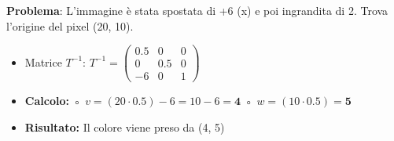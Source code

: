 \documentclass[
]{article}
\providecommand{\tightlist}{%
  \setlength{\itemsep}{0pt}\setlength{\parskip}{0pt}}
\begin{document}
\textbf{Problema}: L'immagine è stata spostata di +6 (x) e poi ingrandita di 2. Trova l'origine del pixel (20, 10).

\begin{itemize}
\tightlist
\item
  Matrice \(T^{-1}\):
  \(T^{-1} = \begin{pmatrix} 0.5 & 0 & 0 \\ 0 & 0.5 & 0 \\ -6 & 0 & 1 \end{pmatrix}\)
\item
  \textbf{Calcolo:}
  ◦ \(v = (20 \cdot 0.5) - 6 = 10 - 6 = \mathbf{4}\)
  ◦ \(w = (10 \cdot 0.5) = \mathbf{5}\)
\item
  \textbf{Risultato:} Il colore viene preso da (4, 5)
\end{itemize}
\end{document}

